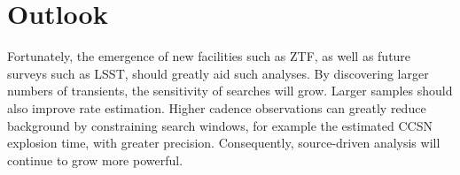 \documentclass{PoS}
\begin{document}
\section{Outlook}

Fortunately, the emergence of new facilities such as ZTF, as well as future surveys such as LSST, should greatly aid such analyses. By discovering larger numbers of transients, the sensitivity of searches will grow. Larger samples should also improve rate estimation. Higher cadence observations can greatly reduce background by constraining search windows, for example the estimated CCSN explosion time, with greater precision. Consequently, source-driven analysis will continue to grow more powerful.




%
\end{document}
